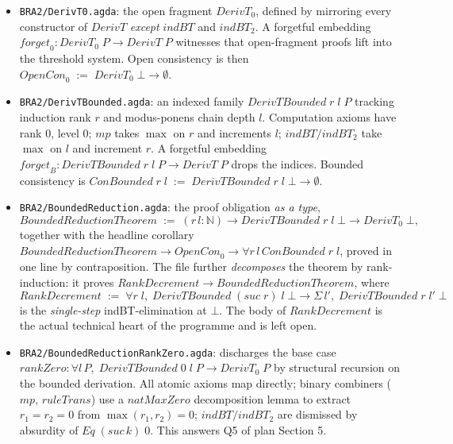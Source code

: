 \documentclass[11pt]{article}
\begin{document}
\begin{itemize}
  \item \verb|BRA2/DerivT0.agda|: the open fragment
        $\mathit{DerivT}_0$, defined by mirroring every constructor of
        $\mathit{DerivT}$ \emph{except} $\mathit{indBT}$ and
        $\mathit{indBT}_2$.  A forgetful embedding
        $\mathit{forget}_0 : \mathit{DerivT}_0\;P \to
         \mathit{DerivT}\;P$ witnesses that open-fragment proofs lift
        into the threshold system.  Open consistency is then
        $\mathit{OpenCon}_0 \;:=\; \mathit{DerivT}_0\;\bot \to \emptyset$.
  \item \verb|BRA2/DerivTBounded.agda|: an indexed family
        $\mathit{DerivTBounded}\;r\;l\;P$ tracking induction rank $r$
        and modus-ponens chain depth $l$.  Computation axioms have
        rank $0$, level $0$; $\mathit{mp}$ takes $\max$ on $r$ and
        increments $l$; $\mathit{indBT}/\mathit{indBT}_2$ take $\max$
        on $l$ and increment $r$.  A forgetful embedding
        $\mathit{forget}_B : \mathit{DerivTBounded}\;r\;l\;P \to
         \mathit{DerivT}\;P$ drops the indices.  Bounded consistency
        is $\mathit{ConBounded}\;r\;l \;:=\;
         \mathit{DerivTBounded}\;r\;l\;\bot \to \emptyset$.
  \item \verb|BRA2/BoundedReduction.agda|: the proof obligation
        \emph{as a type},
        \[
          \mathit{BoundedReductionTheorem} \;:=\; (r\,l : \mathbb N)
          \to \mathit{DerivTBounded}\;r\;l\;\bot \to \mathit{DerivT}_0\;\bot,
        \]
        together with the headline corollary
        $\mathit{BoundedReductionTheorem} \to \mathit{OpenCon}_0 \to
         \forall r\,l\, \mathit{ConBounded}\;r\;l$, proved in one
        line by contraposition.  The file further \emph{decomposes}
        the theorem by rank-induction: it proves
        $\mathit{RankDecrement} \to \mathit{BoundedReductionTheorem}$,
        where
        \[
          \mathit{RankDecrement} \;:=\; \forall r\;l,\;
          \mathit{DerivTBounded}\;(\mathit{suc}\;r)\;l\;\bot \to
          \Sigma\,l'\!,\; \mathit{DerivTBounded}\;r\;l'\;\bot
        \]
        is the \emph{single-step} indBT-elimination at $\bot$.  The
        body of $\mathit{RankDecrement}$ is the actual technical heart
        of the programme and is left open.
  \item \verb|BRA2/BoundedReductionRankZero.agda|: discharges the
        base case $\mathit{rankZero} : \forall l\,P,\;
         \mathit{DerivTBounded}\;0\;l\;P \to \mathit{DerivT}_0\;P$ by
        structural recursion on the bounded derivation.  All atomic
        axioms map directly; binary combiners ($\mathit{mp}$,
        $\mathit{ruleTrans}$) use a $\mathit{natMaxZero}$ decomposition
        lemma to extract $r_1 = r_2 = 0$ from $\max(r_1,r_2) = 0$;
        $\mathit{indBT}/\mathit{indBT}_2$ are dismissed by absurdity
        of $\mathit{Eq}\;(\mathit{suc}\,k)\;0$.  This answers Q5 of
        plan Section 5.
\end{itemize}
\end{document}
